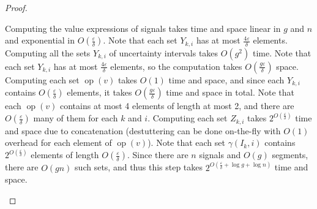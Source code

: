 \begin{proof}
\begin{enumerate}
		
		Computing the value expressions of signals takes time and space linear in $g$ and $n$ and exponential in $O(\frac{\varepsilon}{\delta})$.
		Note that each set $Y_{k,i}$ has at most $\frac{4 \varepsilon}{\delta}$ elements. %
		Computing all the sets $Y_{k,i}$ of uncertainty intervals takes $O(g^2)$ time.
		Note that each set $Y_{k,i}$ has at most $\frac{4 \varepsilon}{\delta}$ elements, so the computation takes $O(\frac{g \varepsilon}{\delta})$ space.
		Computing each set $\operatorname{op}(v)$ takes $O(1)$ time and space, and since each $Y_{k,i}$ contains $O(\frac{\varepsilon}{\delta})$ elements, it takes $O(\frac{g \varepsilon}{\delta})$ time and space in total.
		Note that each $\operatorname{op}(v)$ contains at most 4 elements of length at most 2, and there are $O(\frac{\varepsilon}{\delta})$ many of them for each $k$ and $i$.
		Computing each set $Z_{k,i}$ takes $2^{O(\frac{\varepsilon}{\delta})}$ time and space due to concatenation (destuttering can be done on-the-fly with $O(1)$ overhead for each element of $\operatorname{op}(v)$). %
		Note that each set $\gamma(I_k, i)$ contains $2^{O(\frac{\varepsilon}{\delta})}$ elements of length $O(\frac{\varepsilon}{\delta})$.
		Since there are $n$ signals and $O(g)$ segments, there are $O(gn)$ such sets, and thus this step takes $2^{O(\frac{\varepsilon}{\delta} + \log g + \log n)}$ time and space. 
	
		

\end{enumerate}
\end{proof}
